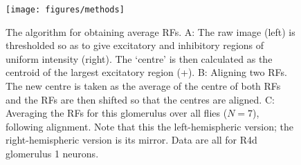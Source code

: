 \begin{figure}
\centering
\texttt{[image: figures/methods]}
\caption{The algorithm for obtaining average RFs.
A: The raw image (left) is thresholded so as to give excitatory and inhibitory regions of uniform intensity (right).
The `centre' is then calculated as the centroid of the largest excitatory region (+).
B: Aligning two RFs.
The new centre is taken as the average of the centre of both RFs and the RFs are then shifted so that the centres are aligned.
C: Averaging the RFs for this glomerulus over all flies ($N=7$), following alignment.
Note that this the left-hemispheric version; the right-hemispheric version is its mirror.
Data are all for R4d glomerulus 1 neurons.}
\label{fig:averagekern}
\end{figure}

